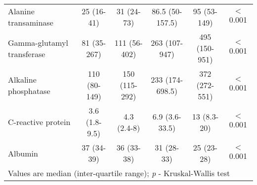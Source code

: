 \begin{sidewaystable}[p]
\begin{tabular}{| l | c c c c |c|}
			Alanine transaminase       & 25 (16-41)       & 31 (24-73)       & 86.5 (50-157.5)  & 95 (53-149)      & $<$0.001 \\
			Gamma-glutamyl transferase & 81 (35-267)      & 111 (56-402)     & 263 (107-947)    & 495 (150-951)    & $<$0.001 \\
			Alkaline phosphatase       & 110 (80-149)     & 150 (115-292)    & 233 (174-698.5)  & 372 (272-551)    & $<$0.001 \\
			C-reactive protein         & 3.6 (1.8-9.5)    & 4.3 (2.4-8)      & 6.9 (3.6-33.5)   & 13 (8.3-20)      & $<$0.001 \\
			Albumin                    & 37 (34-39)       & 36 (33-38)       & 31 (28-33)       & 25 (23-28)       & $<$0.001 \\ \hline
			\multicolumn{6}{l}{Values are median (inter-quartile range); \textit{p} - Kruskal-Wallis test}
		\end{tabular}
	\end{sidewaystable}
	
	